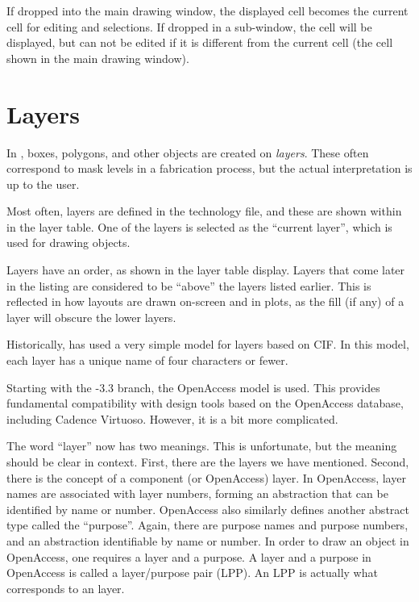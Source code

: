 If dropped into the main drawing window, the displayed cell becomes
the current cell for editing and selections.  If dropped in a
sub-window, the cell will be displayed, but can not be edited if it is
different from the current cell (the cell shown in the main drawing
window).


\section{{\Xic} Layers}

In {\Xic}, boxes, polygons, and other objects are created on {\it
layers\/}.  These often correspond to mask levels in a fabrication
process, but the actual interpretation is up to the user.

Most often, layers are defined in the technology file, and these are
shown within {\Xic} in the layer table.  One of the layers is selected
as the ``current layer'', which is used for drawing objects.

Layers have an order, as shown in the layer table display.  Layers
that come later in the listing are considered to be ``above'' the
layers listed earlier.  This is reflected in how layouts are drawn
on-screen and in plots, as the fill (if any) of a layer will obscure
the lower layers.

Historically, {\Xic} has used a very simple model for layers based on
CIF.  In this model, each layer has a unique name of four characters
or fewer.

Starting with the {\Xic}-3.3 branch, the OpenAccess model is used. 
This provides fundamental compatibility with design tools based on the
OpenAccess database, including Cadence Virtuoso.  However, it is a bit
more complicated.

The word ``layer'' now has two meanings.  This is unfortunate, but the
meaning should be clear in context.  First, there are the {\Xic}
layers we have mentioned.  Second, there is the concept of a component
(or OpenAccess) layer.  In OpenAccess, layer names are associated with
layer numbers, forming an abstraction that can be identified by name
or number.  OpenAccess also similarly defines another abstract type
called the ``purpose''.  Again, there are purpose names and purpose
numbers, and an abstraction identifiable by name or number.  In order
to draw an object in OpenAccess, one requires a layer and a purpose. 
A layer and a purpose in OpenAccess is called a layer/purpose pair
(LPP).  An LPP is actually what corresponds to an {\Xic} layer.

